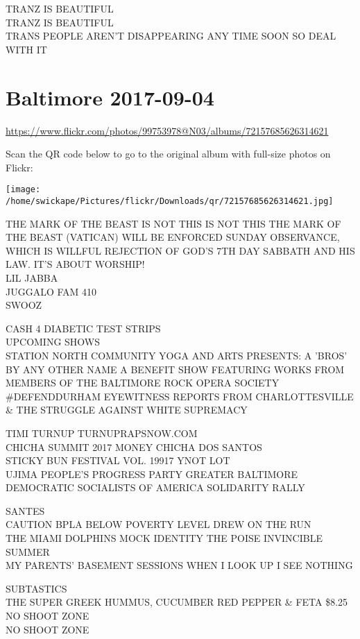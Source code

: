 \documentclass[10pt,letterpaper]{article}
\begin{document}
TRANZ IS BEAUTIFUL\\
TRANZ IS BEAUTIFUL\\
TRANS PEOPLE AREN'T DISAPPEARING ANY TIME SOON SO DEAL WITH IT


\section*{Baltimore 2017-09-04}

\url{https://www.flickr.com/photos/99753978@N03/albums/72157685626314621}

Scan the QR code below to go to the original album with full-size photos on Flickr:

\texttt{[image: /home/swickape/Pictures/flickr/Downloads/qr/72157685626314621.jpg]}


THE MARK OF THE BEAST IS NOT THIS IS NOT THIS THE MARK OF THE BEAST (VATICAN) WILL BE ENFORCED SUNDAY OBSERVANCE, WHICH IS WILLFUL REJECTION OF GOD'S 7TH DAY SABBATH AND HIS LAW.  IT'S ABOUT WORSHIP!\\
LIL JABBA\\
JUGGALO FAM 410\\
SWOOZ

CASH 4 DIABETIC TEST STRIPS\\
UPCOMING SHOWS\\
STATION NORTH COMMUNITY YOGA AND ARTS PRESENTS: A 'BROS' BY ANY OTHER NAME A BENEFIT SHOW FEATURING WORKS FROM MEMBERS OF THE BALTIMORE ROCK OPERA SOCIETY\\
\#DEFENDDURHAM EYEWITNESS REPORTS FROM CHARLOTTESVILLE \& THE STRUGGLE AGAINST WHITE SUPREMACY

TIMI TURNUP TURNUPRAPSNOW.COM\\
CHICHA SUMMIT 2017 MONEY CHICHA DOS SANTOS\\
STICKY BUN FESTIVAL VOL. 19917 YNOT LOT\\
UJIMA PEOPLE'S PROGRESS PARTY GREATER BALTIMORE DEMOCRATIC SOCIALISTS OF AMERICA SOLIDARITY RALLY

SANTES\\
CAUTION BPLA BELOW POVERTY LEVEL DREW ON THE RUN\\
THE MIAMI DOLPHINS MOCK IDENTITY THE POISE INVINCIBLE SUMMER\\
MY PARENTS' BASEMENT SESSIONS WHEN I LOOK UP I SEE NOTHING

SUBTASTICS\\
THE SUPER GREEK HUMMUS, CUCUMBER RED PEPPER \& FETA \$8.25\\
NO SHOOT ZONE\\
NO SHOOT ZONE
\end{document}
